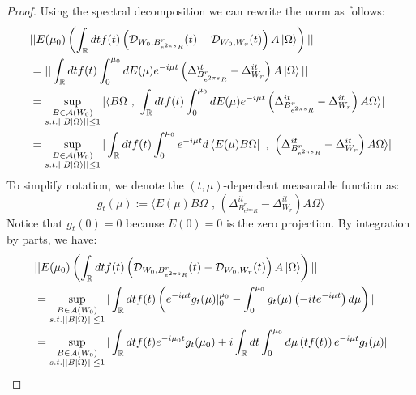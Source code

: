\documentclass[a4paper,11pt]{article}
\theoremstyle{definition}
\newcommand{\lb}{\left(}
\newcommand{\rb}{\right)}
\begin{document}
\begin{proof}
    Using the spectral decomposition we can rewrite the norm as follows:
    \begin{align}
        \begin{split}
            &||E(\mu_0)\lb\int_\mathbb{R} dt f(t)\lb \mathcal{D}_{W_0, B^r_{e^{2\pi s}R}}(t) - \mathcal{D}_{W_0, W_r}(t) \rb A\ket{\Omega}\rb||
            \\&= ||\int_\mathbb{R} dtf(t)\int_0^{\mu_0}dE(\mu) e^{-i\mu t}\lb\Delta_{B^r_{e^{2\pi s}R}}^{it} - \Delta_{W_r}^{it}\rb A\ket{\Omega}||
            \\&
            =\sup_{\substack{B\in\mathcal{A}(W_0)\\s.t.||B\ket{\Omega}||\leq 1}}|\langle B\Omega\text{ , }\int_\mathbb{R}dt f(t)\int_0^{\mu_0}dE(\mu)e^{-i\mu t}\lb\Delta_{B^r_{e^{2\pi s}R}}^{it} - \Delta_{W_r}^{it}\rb A\Omega\rangle|
            \\&
            =\sup_{\substack{B\in\mathcal{A}(W_0)\\ s.t.||B\ket{\Omega}||\leq 1}}|\int_\mathbb{R}dt f(t)\int_0^{\mu_0}e^{-i\mu t}d\bra{E(\mu) B\Omega}\text{ , }\lb\Delta_{B^r_{e^{2\pi s}R}}^{it} - \Delta_{W_r}^{it}\rb A\Omega\rangle|
        \end{split}
    \end{align}
    To simplify notation, we denote the $(t,\mu)$-dependent measurable function as:
    \begin{equation}
        g_t(\mu) := \langle E(\mu) B\Omega\text{ , }\lb\Delta^{it}_{B^r_{e^{2\pi s}R}} - \Delta^{it}_{W_r}\rb A\Omega\rangle
    \end{equation}
    Notice that $g_t(0) = 0$ because $E(0) = 0$ is the zero projection. By integration by parts, we have:
    \begin{align}
        \begin{split}
            &||E(\mu_0)\lb\int_\mathbb{R} dt f(t)\lb\mathcal{D}_{W_0, B^r_{e^{2\pi s}R}}(t) - \mathcal{D}_{W_0, W_r}(t)\rb A\ket{\Omega}\rb||
            \\&
            =\sup_{\substack{B\in\mathcal{A}(W_0)\\s.t.||B\ket{\Omega}||\leq 1}}|\int_\mathbb{R}dt f(t)\lb e^{-i\mu t}g_t(\mu)|_0^{\mu_0} - \int_0^{\mu_0}g_t(\mu)\lb-ite^{-i\mu t}\rb d\mu \rb|
            \\&
            =\sup_{\substack{B\in\mathcal{A}(W_0)\\s.t.||B\ket{\Omega}||\leq 1}}|\int_\mathbb{R} dt f(t) e^{-i\mu_0 t}g_t(\mu_0) + i\int_\mathbb{R} dt \int_0^{\mu_0} d\mu \lb tf(t)\rb e^{-i\mu t} g_t(\mu)|

\end{split}
\end{align}
\end{proof}
\end{document}
